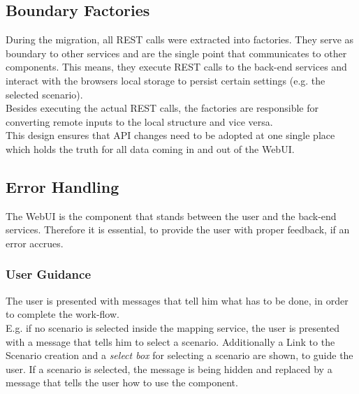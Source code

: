 \subsection{Boundary Factories}
During the migration, all REST calls were extracted into factories. They serve as boundary to other services and are the single point that communicates to other components. This means, they execute REST calls to the back-end services and interact with the browsers local storage to persist certain settings (e.g. the selected scenario).\\
Besides executing the actual REST calls, the factories are responsible for converting remote inputs to the local structure and vice versa.\\
This design ensures that API changes need to be adopted at one single place which holds the truth for all data coming in and out of the WebUI.


\subsection{Error Handling}
The WebUI is the component that stands between the user and the back-end services. Therefore it is essential, to provide the user with proper feedback, if an error accrues.

\subsubsection{User Guidance}
The user is presented with messages that tell him what has to be done, in order to complete the work-flow.\\
E.g. if no scenario is selected inside the mapping service, the user is presented with a message that tells him to select a scenario. Additionally a Link to the Scenario creation and a \textit{select box} for selecting a scenario are shown, to guide the user. If a scenario is selected, the message is being hidden and replaced by a message that tells the user how to use the component.

